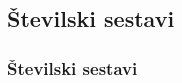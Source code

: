 




    \subsection{Številski sestavi}

        \begin{frame}
            \frametitle{Številski sestavi}
        \end{frame}

